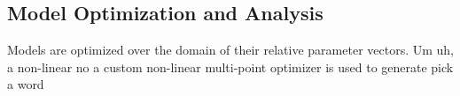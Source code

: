 \subsection{Model Optimization and Analysis}

Models are optimized over the domain of their relative parameter vectors. Um uh, a non-linear no a custom non-linear multi-point optimizer is used to generate pick a word 

\subsubsection{}